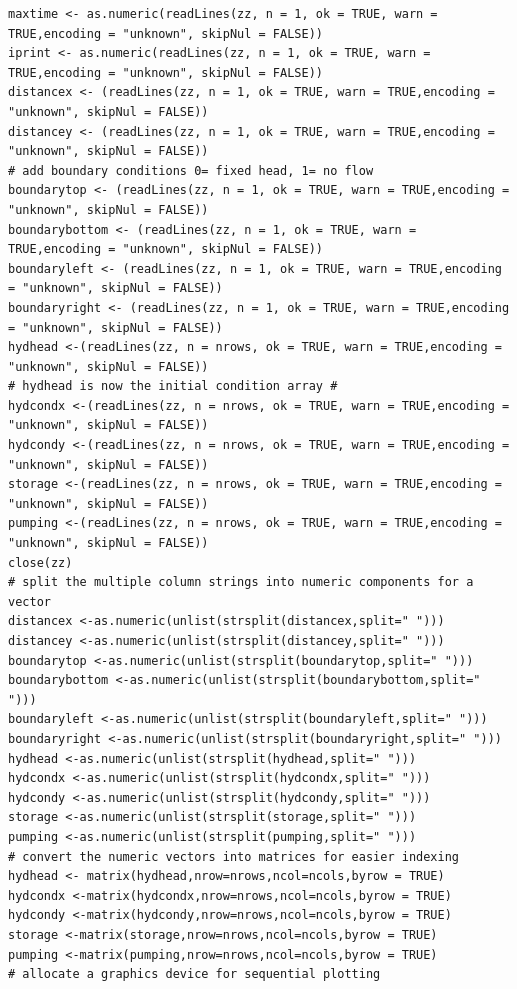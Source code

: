 \begin{lstlisting}
maxtime <- as.numeric(readLines(zz, n = 1, ok = TRUE, warn = TRUE,encoding = "unknown", skipNul = FALSE))
iprint <- as.numeric(readLines(zz, n = 1, ok = TRUE, warn = TRUE,encoding = "unknown", skipNul = FALSE))
distancex <- (readLines(zz, n = 1, ok = TRUE, warn = TRUE,encoding = "unknown", skipNul = FALSE))
distancey <- (readLines(zz, n = 1, ok = TRUE, warn = TRUE,encoding = "unknown", skipNul = FALSE))
# add boundary conditions 0= fixed head, 1= no flow
boundarytop <- (readLines(zz, n = 1, ok = TRUE, warn = TRUE,encoding = "unknown", skipNul = FALSE))
boundarybottom <- (readLines(zz, n = 1, ok = TRUE, warn = TRUE,encoding = "unknown", skipNul = FALSE))
boundaryleft <- (readLines(zz, n = 1, ok = TRUE, warn = TRUE,encoding = "unknown", skipNul = FALSE))
boundaryright <- (readLines(zz, n = 1, ok = TRUE, warn = TRUE,encoding = "unknown", skipNul = FALSE))
hydhead <-(readLines(zz, n = nrows, ok = TRUE, warn = TRUE,encoding = "unknown", skipNul = FALSE))
# hydhead is now the initial condition array #
hydcondx <-(readLines(zz, n = nrows, ok = TRUE, warn = TRUE,encoding = "unknown", skipNul = FALSE))
hydcondy <-(readLines(zz, n = nrows, ok = TRUE, warn = TRUE,encoding = "unknown", skipNul = FALSE))
storage <-(readLines(zz, n = nrows, ok = TRUE, warn = TRUE,encoding = "unknown", skipNul = FALSE))
pumping <-(readLines(zz, n = nrows, ok = TRUE, warn = TRUE,encoding = "unknown", skipNul = FALSE)) 
close(zz)
# split the multiple column strings into numeric components for a vector
distancex <-as.numeric(unlist(strsplit(distancex,split=" ")))
distancey <-as.numeric(unlist(strsplit(distancey,split=" ")))
boundarytop <-as.numeric(unlist(strsplit(boundarytop,split=" ")))
boundarybottom <-as.numeric(unlist(strsplit(boundarybottom,split=" ")))
boundaryleft <-as.numeric(unlist(strsplit(boundaryleft,split=" ")))
boundaryright <-as.numeric(unlist(strsplit(boundaryright,split=" ")))
hydhead <-as.numeric(unlist(strsplit(hydhead,split=" ")))
hydcondx <-as.numeric(unlist(strsplit(hydcondx,split=" ")))
hydcondy <-as.numeric(unlist(strsplit(hydcondy,split=" ")))
storage <-as.numeric(unlist(strsplit(storage,split=" ")))
pumping <-as.numeric(unlist(strsplit(pumping,split=" ")))
# convert the numeric vectors into matrices for easier indexing
hydhead <- matrix(hydhead,nrow=nrows,ncol=ncols,byrow = TRUE)
hydcondx <-matrix(hydcondx,nrow=nrows,ncol=ncols,byrow = TRUE)
hydcondy <-matrix(hydcondy,nrow=nrows,ncol=ncols,byrow = TRUE)
storage <-matrix(storage,nrow=nrows,ncol=ncols,byrow = TRUE)
pumping <-matrix(pumping,nrow=nrows,ncol=ncols,byrow = TRUE)
# allocate a graphics device for sequential plotting

\end{lstlisting}
